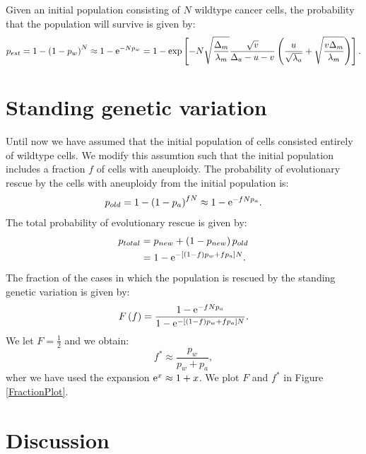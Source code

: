 \documentclass[11pt,a4paper]{article}
\newcommand{\e}{{\rm e}}
\begin{document}
Given an initial population consisting of $N$ wildtype cancer cells, the probability that the population will survive is given by: 
\begin{align*}
p_{est}=1-\left(1-p_w\right)^N\approx 1-\e^{-Np_w}=1-\exp\left[-N\sqrt{\frac{\Delta_m}{\lambda_m}}\frac{\sqrt{v}}{\Delta_a-u-v}\left(\frac{u}{\sqrt{\lambda_a}}+\sqrt{\frac{v\Delta_m}{\lambda_m}}\right)\right].
\end{align*}


\section{Standing genetic variation}
Until now we have assumed that the initial population of cells consisted entirely of wildtype cells. We modify this assumtion such that the initial population includes a fraction $f$ of cells with aneuploidy. The probability of evolutionary rescue by the cells with aneuploidy from the initial population is:
\begin{equation*}
p_{old}=1-\left(1-p_a\right)^{fN}\approx 1-\e^{-fNp_a}.
\end{equation*}
The total probability of evolutionary rescue is given by:
\begin{align}\nonumber
p_{total}&=p_{new}+\left(1-p_{new}\right)p_{old}\\
&=1-\e^{-\left[\left(1-f\right)p_w+fp_a\right]N}.
\end{align}
The fraction of the cases in which the population is rescued by the standing genetic variation is given by:
\begin{align*}
F\left(f\right)=\frac{ 1-\e^{-fNp_a}}{1-\e^{-\left[\left(1-f\right)p_w+fp_a\right]N}}.
\end{align*}
We let $F=\frac{1}{2}$ and we obtain:
\begin{equation*}
f^*\approx\frac{p_w}{p_w+p_a},
\end{equation*}
wher we have used the expansion $\e^x\approx 1+x$.
We plot $F$ and $f^*$ in Figure \ref{FractionPlot}.

\section{Discussion}
\end{document}
